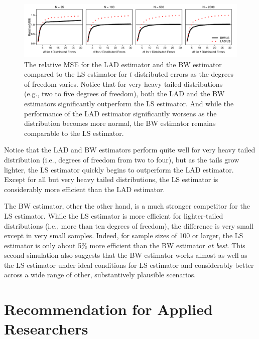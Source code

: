 \documentclass[12pt]{article}
\begin{document}
\begin{figure}[h!]
\begin{center}
\includegraphics[width = \textwidth]{figs/mc-sims.pdf}
\caption{The relative MSE for the LAD estimator and the BW estimator compared to the LS estimator for $t$ distributed errors as the degrees of freedom varies. 
Notice that for very heavy-tailed distributions (e.g., two to five degrees of freedom), both the LAD and the BW estimators significantly outperform the LS estimator. 
And while the performance of the LAD estimator significantly worsens as the distribution becomes more normal, the BW estimator remains comparable to the LS estimator.}\label{fig:mc-sims}
\end{center}
\end{figure}

Notice that the LAD and BW estimators perform quite well for very heavy tailed distribution (i.e., degrees of freedom from two to four), but as the tails grow lighter, the LS estimator quickly begins to outperform the LAD estimator. 
Except for all but very heavy tailed distributions, the LS estimator is considerably more efficient than the LAD estimator. 

The BW estimator, other the other hand, is a much stronger competitor for the LS estimator. 
While the LS estimator is more efficient for lighter-tailed distributions (i.e., more than ten degrees of freedom), the difference is very small except in very small samples. 
Indeed, for sample sizes of 100 or larger, the LS estimator is only about 5\% more efficient than the BW estimator \textit{at best}. 
This second simulation also suggests that the BW estimator works almost as well as the LS estimator under ideal conditions for LS estimator and considerably better across a wide range of other, substantively plausible scenarios.

\section*{Recommendation for Applied Researchers}
\end{document}
